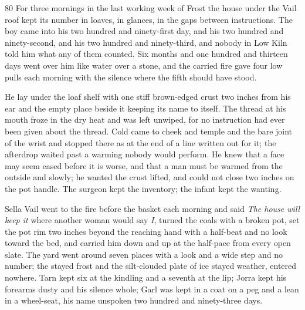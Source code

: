 
\scenebreak


\scenebreak


\scenebreak

\CRtailpiece
\begin{CRchronicle}{80}
For three mornings in the last working week of Frost the house under the Vail roof kept its number in loaves, in glances, in the gaps between instructions. The boy came into his two hundred and ninety-first day, and his two hundred and ninety-second, and his two hundred and ninety-third, and nobody in Low Kiln told him what any of them counted. Six months and one hundred and thirteen days went over him like water over a stone, and the carried fire gave four low pulls each morning with the silence where the fifth should have stood.

He lay under the loaf shelf with one stiff brown-edged crust two inches from his ear and the empty place beside it keeping its name to itself. The thread at his mouth froze in the dry heat and was left unwiped, for no instruction had ever been given about the thread. Cold came to cheek and temple and the bare joint of the wrist and stopped there as at the end of a line written out for it; the afterdrop waited past a warming nobody would perform. He knew that a face may seem eased before it is worse, and that a man must be warmed from the outside and slowly; he wanted the crust lifted, and could not close two inches on the pot handle. The surgeon kept the inventory; the infant kept the wanting.

Sella Vail went to the fire before the basket each morning and said \emph{The house will keep it} where another woman would say \emph{I}, turned the coals with a broken pot, set the pot rim two inches beyond the reaching hand with a half-beat and no look toward the bed, and carried him down and up at the half-pace from every open slate. The yard went around seven places with a look and a wide step and no number; the stayed frost and the silt-clouded plate of ice stayed weather, entered nowhere. Tarn kept six at the kindling and a seventh at the lip; Jorra kept his forearms dusty and his silence whole; Garl was kept in a coat on a peg and a lean in a wheel-seat, his name unspoken two hundred and ninety-three days.


\end{CRchronicle}
